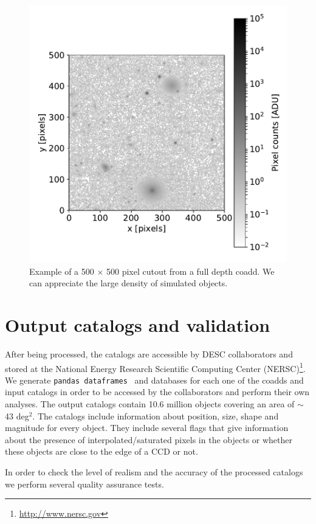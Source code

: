 \documentclass[\docopts]{\docclass}
\begin{document}
\begin{figure}
\centering
\includegraphics[width=0.9\columnwidth]{sample_coadd_DC1.pdf}
\caption{Example of a 500 $\times$ 500 pixel cutout from a full depth coadd. We can appreciate the large density of simulated objects.}
\label{fig:coadd_example}
\end{figure}

\section{Output catalogs and validation}
\label{sec:catalogs}

After being processed, the catalogs are accessible by DESC collaborators and stored at the National Energy Research Scientific Computing Center (NERSC)\footnote{\url{http://www.nersc.gov}}. We generate \texttt{pandas
dataframes}~\citep{mckinneypandas} and databases for each one of the coadds and input catalogs in order to be accessed by the collaborators and perform their own analyses. The output catalogs contain 10.6 million objects covering an area
of $\sim$ 43 deg$^{2}$. The catalogs include information about position, size, shape and magnitude for every object. They include several flags that give information about the presence of interpolated/saturated pixels in the objects or whether these objects are close to the edge of a CCD or not.

In order to check the level of realism and the accuracy of the processed catalogs we perform several quality assurance tests.
\end{document}
